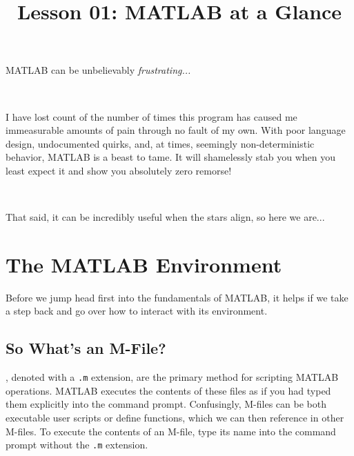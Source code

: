 \documentclass{article}
\title{Lesson 01: MATLAB at a Glance}
\begin{document}
\renderTitle

\noindent
MATLAB can be unbelievably \emph{frustrating...}

\

\noindent
I have lost count of the number of times this program has caused me
immeasurable amounts of pain through no fault of my own. With poor
language design, undocumented quirks, and, at times, seemingly
non-deterministic behavior, MATLAB is a beast to tame.  It will
shamelessly stab you when you least expect it and show you absolutely
zero remorse!

\

\noindent
That said, it can be incredibly useful when the stars align, so here we
are...

\section{The MATLAB Environment}

Before we jump head first into the fundamentals of MATLAB, it helps if
we take a step back and go over how to interact with its environment.

\subsection{So What’s an M-File?}

, denoted with a \texttt{.m} extension, are the primary
method for scripting MATLAB operations.  MATLAB executes the contents of
these files as if you had typed them explicitly into the command prompt.
Confusingly, M-files can be both executable user scripts or define
functions, which we can then reference in other M-files.  To execute the
contents of an M-file, type its name into the command prompt without the
\texttt{.m} extension.
\end{document}
